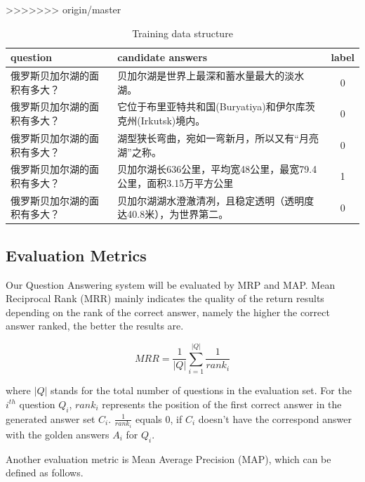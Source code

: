 \documentclass{llncs}
\begin{document}
\begin{table}[!htbp]
\begin{table}[!htbp]
\begin{table}[!htbp]
\begin{table}[!hbp]
>>>>>>> origin/master
\caption{Training data structure}
\scriptsize
\label{tab:table1}
\begin{tabular}{|l|l|c|}
 \hline
question & candidate answers & label \\ \hline
俄罗斯贝加尔湖的面积有多大？& 贝加尔湖是世界上最深和蓄水量最大的淡水湖。& 0 \\
\hline
俄罗斯贝加尔湖的面积有多大？& 它位于布里亚特共和国(Buryatiya)和伊尔库茨克州(Irkutsk)境内。&0\\
\hline
俄罗斯贝加尔湖的面积有多大？& 湖型狭长弯曲，宛如一弯新月，所以又有“月亮湖”之称。&0\\
\hline
俄罗斯贝加尔湖的面积有多大？& 贝加尔湖长636公里，平均宽48公里，最宽79.4公里，面积3.15万平方公里& 1\\
\hline
俄罗斯贝加尔湖的面积有多大？& 贝加尔湖湖水澄澈清冽，且稳定透明（透明度达40.8米），为世界第二。&0\\
\hline
\end{tabular}

\end{table}

\subsection{Evaluation Metrics}
Our Question Answering system will be evaluated by MRP and MAP. Mean Reciprocal Rank (MRR) mainly indicates the quality of the return results depending on the rank of the correct answer, namely the higher the correct answer ranked, the better the results are.

\begin{equation}
MRR=\frac{1}{|Q|}\sum_{i=1}^{|Q|}\frac{1}{rank_{i}}
\end{equation}

where $|Q|$ stands for the total number of questions in the evaluation set. For the \(i^{th}\) question \(Q_{i}\), \(rank_{i}\) represents the position of the first correct answer in the generated answer set \(C_{i}\).  \(\frac{1}{rank_{i}}\) equals 0, if \(C_{i}\) doesn't have the correspond answer with the golden answers \(A_{i}\) for \(Q_{i}\). 

Another evaluation metric is Mean Average Precision (MAP), which can be defined as follows.



\end{table}
\end{table}
\end{table}
\end{document}
